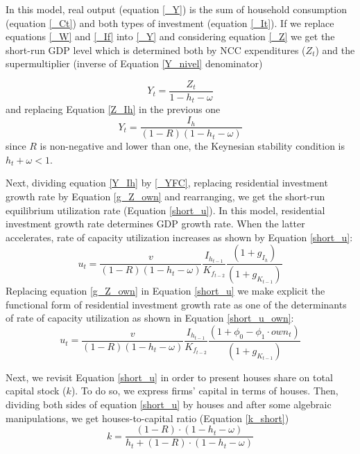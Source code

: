 \documentclass[12pt]{article}
\begin{document}
In this model, real output (equation \ref{_Y}) is the sum of household consumption (equation \ref{_Ct}) and both types of investment (equation \ref{_It}). 
If we replace equations \ref{_W} and  \ref{_If} into \ref{_Y} and considering equation \ref{_Z} we get the short-run GDP level which is determined both by NCC expenditures (\(Z_t\)) and the supermultiplier (inverse of Equation \ref{Y_nivel} denominator)

\begin{equation}
\label{Y_nivel}
Y_t = \frac{Z_t}{1 - h_t - \omega}
\end{equation}
and replacing Equation \ref{Z_Ih} in the previous one
\begin{equation}
\label{Y_Ih}
Y_t = \frac{I_h}{(1-R)(1 - h_t - \omega)}
\end{equation}
since \(R\) is non-negative and lower than one, the Keynesian stability condition is \(h_{t} + \omega < 1\).

Next, dividing equation \ref{Y_Ih} by \ref{_YFC},  replacing residential investment growth rate by Equation \ref{g_Z_own}  and rearranging, we get the short-run equilibrium utilization rate (Equation \ref{short_u}).
In this model, residential investment growth rate determines GDP growth rate.
When the latter accelerates, rate of capacity utilization increases as shown by Equation \ref{short_u}:
\begin{equation}
\label{short_u}
u_t = \frac{v}{(1-R)(1-h_t - \omega)}\frac{I_{h_{t-1}}}{K_{f_{t-2}}}\frac{(1 + g_{I_h})}{(1+g_{K_{t-1}})}
\end{equation}
Replacing equation \ref{g_Z_own} in Equation \ref{short_u} we make explicit the functional form of residential investment growth rate as one of the determinants of rate of capacity utilization as shown in Equation \ref{short_u_own}:
\begin{equation}
\label{short_u_own}
u_t = \frac{v}{(1-R)(1-h_t - \omega)}\frac{I_{h_{t-1}}}{K_{f_{t-2}}}\frac{(1 + \phi_0 - \phi_1\cdot own_t)}{(1+g_{K_{t-1}})}
\end{equation}

Next, we revisit Equation \ref{short_u} in order to present houses share on total capital stock (\(k\)).
To do so, we express firms' capital in terms of houses. 
Then, dividing both sides of equation \ref{short_u} by houses and after some algebraic manipulations, we get houses-to-capital ratio (Equation \ref{k_short})
\begin{equation}
\label{k_short}
k = \frac{(1-R)\cdot (1-h_t - \omega)}{h_t + (1-R)\cdot (1-h_t - \omega)}
\end{equation}
\end{document}
